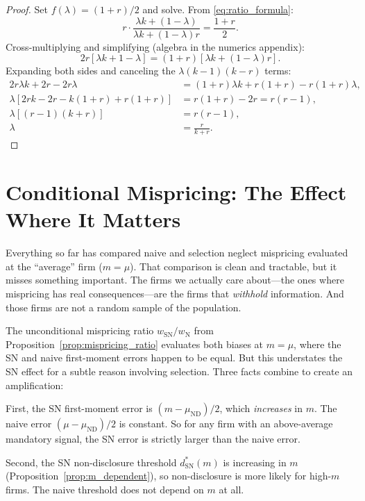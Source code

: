 \documentclass[12pt]{article}
\theoremstyle{plain}
\theoremstyle{definition}
\newcommand{\ND}{\mathrm{ND}}
\newcommand{\SN}{\mathrm{SN}}
\newcommand{\N}{\mathrm{N}}
\begin{document}
\begin{proof}
Set $f(\lambda) = (1+r)/2$ and solve. From \eqref{eq:ratio_formula}:
\[
r \cdot \frac{\lambda k + (1-\lambda)}{\lambda k + (1-\lambda)r} = \frac{1+r}{2}.
\]
Cross-multiplying and simplifying (algebra in the numerics appendix):
\[
2r[\lambda k + 1 - \lambda] = (1+r)[\lambda k + (1-\lambda)r].
\]
Expanding both sides and canceling the $\lambda(k-1)(k-r)$ terms:
\begin{align*}
2r\lambda k + 2r - 2r\lambda &= (1+r)\lambda k + r(1+r) - r(1+r)\lambda, \\
\lambda[2rk - 2r - k(1+r) + r(1+r)] &= r(1+r) - 2r = r(r-1), \\
\lambda[(r-1)(k + r)] &= r(r-1), \\
\lambda &= \frac{r}{k + r}.
\end{align*}
\end{proof}


\section{Conditional Mispricing: The Effect Where It Matters}
\label{sec:conditional}

Everything so far has compared naive and selection neglect mispricing evaluated at the ``average'' firm ($m = \mu$). That comparison is clean and tractable, but it misses something important. The firms we actually care about---the ones where mispricing has real consequences---are the firms that \emph{withhold} information. And those firms are not a random sample of the population.

The unconditional mispricing ratio $w_\SN/w_\N$ from Proposition~\ref{prop:mispricing_ratio} evaluates both biases at $m = \mu$, where the SN and naive first-moment errors happen to be equal. But this understates the SN effect for a subtle reason involving selection. Three facts combine to create an amplification:

First, the SN first-moment error is $(m - \mu_{\ND})/2$, which \emph{increases} in $m$. The naive error $(\mu - \mu_{\ND})/2$ is constant. So for any firm with an above-average mandatory signal, the SN error is strictly larger than the naive error.

Second, the SN non-disclosure threshold $d^*_\SN(m)$ is increasing in $m$ (Proposition~\ref{prop:m_dependent}), so non-disclosure is more likely for high-$m$ firms. The naive threshold does not depend on $m$ at all.
\end{document}
